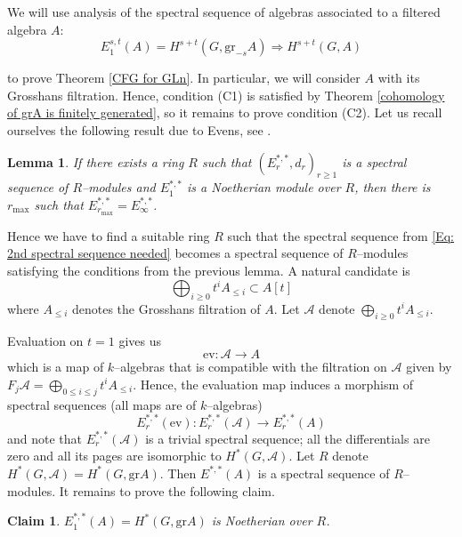 \documentclass{article}
\theoremstyle{plain}
\newtheorem{Lemma}[Th]{Lemma}
\newtheorem{Claim}[Th]{Claim}
\theoremstyle{definition}
\begin{document}
We will use analysis of  the spectral sequence of algebras associated to a filtered algebra $A$:
\begin{equation}\label{Eq: 2nd spectral sequence needed}
E_1^{s,t}(A)=H^{s+t}(G,\mathrm{gr}_{-s}A)\Rightarrow H^{s+t}(G,A)    
\end{equation}

to prove Theorem \ref{CFG for GLn}. In particular, we will consider $A$ with its Grosshans filtration. Hence, condition (C1) is satisfied by Theorem \ref{cohomology of grA is finitely generated}, so it remains to prove condition (C2). Let us recall ourselves the following result due to Evens, see \cite{Eve61}. 

\begin{Lemma}
    If there exists a ring $R$ such that  $(E^{\ast,\ast}_r,d_r)_{r\geq1}$ is a spectral sequence of $R$--modules and $E^{\ast,\ast}_1$ is a Noetherian module over $R$, then there is $r_\mathrm{max}$ such that $E^{\ast,\ast}_{r_\mathrm{max}}=E^{\ast,\ast}_\infty$. 
\end{Lemma}

Hence we have to find a suitable ring $R$ such that the spectral sequence from \ref{Eq: 2nd spectral sequence needed} becomes a spectral sequence of $R$--modules satisfying the conditions from the previous lemma. A natural candidate is 
\[
\bigoplus_{i\geq0}t^iA_{\leq i}\subset A[t]
\]
where $A_{\leq i} $ denotes the Grosshans filtration of $A$. Let $\mathcal{A}$ denote $\bigoplus_{i\geq0}t^iA_{\leq i}$.

Evaluation on $t=1$ gives us 
\[
\mathrm{ev}\colon\mathcal{A}\to A
\]
which is a map of $k$--algebras that is compatible with the filtration on $\mathcal{A}$ given by $F_j\mathcal{A}=\bigoplus_{0\leq i\leq j} t^i A_{\leq i}$. Hence, the evaluation map induces a morphism of spectral sequences (all maps are of $k$--algebras) 
\[
E^{\ast,\ast}_r(\mathrm{ev})\colon E^{\ast,\ast}_r(\mathcal{A}) \to E^{\ast,\ast}_r(A)
\]
and note that $E^{\ast,\ast}_r(\mathcal{A})$ is a trivial spectral sequence; all the differentials are zero and all its pages are isomorphic to $H^\ast(G,\mathcal{A})$. Let $R$ denote $H^\ast(G,\mathcal{A})=H^\ast(G,\mathrm{gr}A)$. Then $E^{\ast,\ast}(A)$ is a spectral sequence of $R$--modules. It remains to prove the following claim.

\begin{Claim}\label{E_1 is Noetherian over R}
    $E^{\ast,\ast}_1(A)=H^\ast(G,\mathrm{gr}A)$ is Noetherian over $R$.    
\end{Claim}
\end{document}
